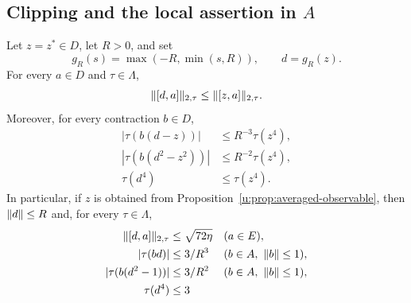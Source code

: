 \subsection{Clipping and the local assertion in \texorpdfstring{$A$}{A}}

\begin{lemma}
\label{u:lem:clipping}
Let $z=z^*\in D$, let $R>0$, and set
\[
 g_R(s)=\max(-R,\min(s,R)),\qquad d=g_R(z).
\]
For every $a\in D$ and $\tau\in\Lambda$,
\begin{equation}
 \lVert[d,a]\rVert_{2,\tau}\le\lVert[z,a]\rVert_{2,\tau}.
 \label{u:eq:clipping-commutator}
\end{equation}
Moreover, for every contraction $b\in D$,
\begin{equation}
 \begin{aligned}
  |\tau(b(d-z))|&\le R^{-3}\tau(z^4),\\
  |\tau(b(d^2-z^2))|&\le R^{-2}\tau(z^4),\\
  \tau(d^4)&\le\tau(z^4).
 \end{aligned}
 \label{u:eq:clipping-tails}
\end{equation}
In particular, if $z$ is obtained from
Proposition~\ref{u:prop:averaged-observable}, then $\lVert d\rVert\le R$ and,
for every $\tau\in\Lambda$,
\begin{equation}
 \begin{aligned}
  \lVert[d,a]\rVert_{2,\tau}&\le\sqrt{72\eta} &&(a\in E),\\
  |\tau(bd)|&\le3/R^3 &&(b\in A,\ \lVert b\rVert\le1),\\
  |\tau(b(d^2-1))|&\le3/R^2 &&(b\in A,\ \lVert b\rVert\le1),\\
  \tau(d^4)&\le3
 \end{aligned}
 \label{u:eq:clipped-moments}
\end{equation}
\end{lemma}

